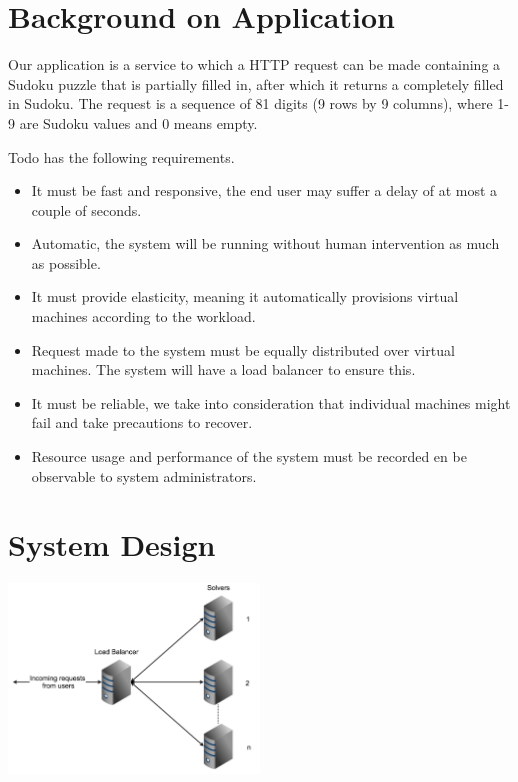 \documentclass[twoside]{article}
\newcommand{\appName}{Todo }
\begin{document}
\begin{multicols}{2}
\section{Background on Application}

Our application is a service to which a HTTP request can be made containing a Sudoku puzzle that is partially filled in, after which it returns a completely filled in Sudoku. The request is a sequence of 81 digits (9 rows by 9 columns), where 1-9 are Sudoku values and 0 means empty. 

\appName has the following requirements.
\begin{itemize}
\item It must be fast and responsive, the end user may suffer a delay of at most a couple of seconds.
\item Automatic, the system will be running without human intervention as much as possible.
\item It must provide elasticity, meaning it automatically provisions virtual machines according to the workload.
\item Request made to the system must be equally distributed over virtual machines. The system will have a load balancer to ensure this.
\item It must be reliable, we take into consideration that individual machines might fail and take precautions to recover.
\item Resource usage and performance of the system must be recorded en be observable to system administrators.
\end{itemize}


\section{System Design}

\includegraphics[width=0.5\textwidth]{img/arch}


\end{multicols}
\end{document}
